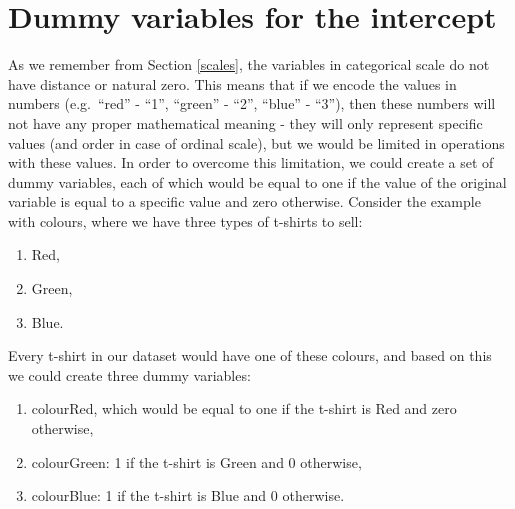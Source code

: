 \documentclass[
]{book}
\providecommand{\tightlist}{%
  \setlength{\itemsep}{0pt}\setlength{\parskip}{0pt}}
\theoremstyle{definition}
\theoremstyle{definition}
\theoremstyle{definition}
\theoremstyle{definition}
\theoremstyle{remark}
\begin{document}
\hypertarget{dummy-variables-for-the-intercept}{%
\section{Dummy variables for the intercept}\label{dummy-variables-for-the-intercept}}

As we remember from Section \ref{scales}, the variables in categorical scale do not have distance or natural zero. This means that if we encode the values in numbers (e.g.~``red'' - ``1'', ``green'' - ``2'', ``blue'' - ``3''), then these numbers will not have any proper mathematical meaning - they will only represent specific values (and order in case of ordinal scale), but we would be limited in operations with these values. In order to overcome this limitation, we could create a set of dummy variables, each of which would be equal to one if the value of the original variable is equal to a specific value and zero otherwise. Consider the example with colours, where we have three types of t-shirts to sell:

\begin{enumerate}
\def\labelenumi{\arabic{enumi}.}
\tightlist
\item
  Red,
\item
  Green,
\item
  Blue.
\end{enumerate}

Every t-shirt in our dataset would have one of these colours, and based on this we could create three dummy variables:

\begin{enumerate}
\def\labelenumi{\arabic{enumi}.}
\tightlist
\item
  colourRed, which would be equal to one if the t-shirt is Red and zero otherwise,
\item
  colourGreen: 1 if the t-shirt is Green and 0 otherwise,
\item
  colourBlue: 1 if the t-shirt is Blue and 0 otherwise.
\end{enumerate}
\end{document}
